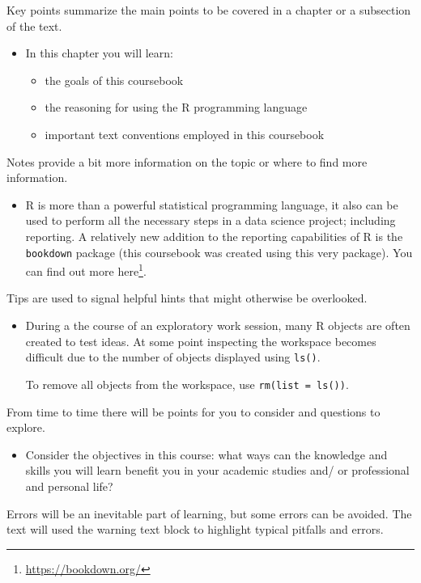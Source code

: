 \documentclass[
]{article}
\DeclareRobustCommand{\href}[2]{#2\footnote{\url{#1}}}
\providecommand{\tightlist}{%
  \setlength{\itemsep}{0pt}\setlength{\parskip}{0pt}}
\newenvironment{rmdblock}[1]
  {\begin{shaded*}
  \begin{itemize}
  \renewcommand{\labelitemi}{
    \raisebox{-.5\height}[0pt][0pt]{
      {\setkeys{Gin}{width=2em,keepaspectratio}\texttt{[image: assets/images/\#1]}}
    }
  }
  \item
  }
  {
  \end{itemize}
  \end{shaded*}
  }
\newenvironment{rmdkey}
  {\begin{rmdblock}{key}}
  {\end{rmdblock}}
\newenvironment{rmdnote}
  {\begin{rmdblock}{note}}
  {\end{rmdblock}}
\newenvironment{rmdtip}
  {\begin{rmdblock}{tip}}
  {\end{rmdblock}}
\newenvironment{rmdquestion}
  {\begin{rmdblock}{question}}
  {\end{rmdblock}}
\begin{document}
Key points summarize the main points to be covered in a chapter or a subsection of the text.

\begin{rmdkey}
In this chapter you will learn:

\begin{itemize}
\tightlist
\item
  the goals of this coursebook
\item
  the reasoning for using the R programming language
\item
  important text conventions employed in this coursebook
\end{itemize}
\end{rmdkey}

Notes provide a bit more information on the topic or where to find more information.

\begin{rmdnote}
R is more than a powerful statistical programming language, it also can
be used to perform all the necessary steps in a data science project;
including reporting. A relatively new addition to the reporting
capabilities of R is the \texttt{bookdown} package (this coursebook was
created using this very package). You can find out more
\href{https://bookdown.org/}{here}.
\end{rmdnote}

Tips are used to signal helpful hints that might otherwise be overlooked.

\begin{rmdtip}
During a the course of an exploratory work session, many R objects are
often created to test ideas. At some point inspecting the workspace
becomes difficult due to the number of objects displayed using
\texttt{ls()}.

To remove all objects from the workspace, use
\texttt{rm(list\ =\ ls())}.
\end{rmdtip}

From time to time there will be points for you to consider and questions to explore.

\begin{rmdquestion}
Consider the objectives in this course: what ways can the knowledge and
skills you will learn benefit you in your academic studies and/ or
professional and personal life?
\end{rmdquestion}

Errors will be an inevitable part of learning, but some errors can be avoided. The text will used the warning text block to highlight typical pitfalls and errors.
\end{document}
